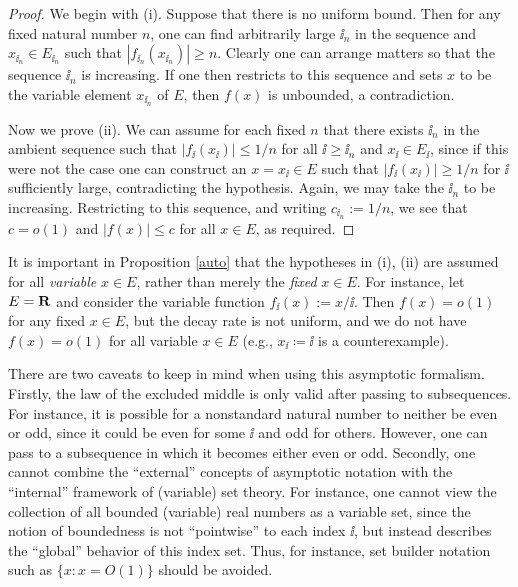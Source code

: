 \begin{proof} We begin with (i).  Suppose that there is no uniform bound.  Then for any fixed natural number $n$, one can find arbitrarily large $\ii_n$ in the sequence and $x_{\ii_n} \in E_{\ii_n}$ such that $|f_{\ii_n}(x_{\ii_n})| \geq n$.  Clearly one can arrange matters so that the sequence $\ii_n$ is increasing.  If one then restricts to this sequence and sets $x$ to be the variable element $x_{\ii_n}$ of $E$, then $f(x)$ is unbounded, a contradiction.

Now we prove (ii).  We can assume for each fixed $n$ that there exists $\ii_n$ in the ambient sequence such that $|f_{\ii}(x_{\ii})| \leq 1/n$ for all $\ii \geq \ii_n$ and $x_{\ii} \in E_{\ii}$, since if this were not the case one can construct an $x = x_{\ii} \in E$ such that $|f_{\ii}(x_{\ii})| \geq 1/n$ for $\ii$ sufficiently large, contradicting the hypothesis.  Again, we may take the $\ii_n$ to be increasing.  Restricting to this sequence, and writing $c_{\ii_n} := 1/n$, we see that $c=o(1)$ and $|f(x)| \leq c$ for all $x \in E$, as required.
\end{proof}

\begin{remark} It is important in Proposition \ref{auto} that the hypotheses in (i), (ii) are assumed for all \emph{variable} $x \in E$, rather than merely the \emph{fixed} $x \in E$.  For instance, let $E = \mathbf{R}$ and consider the variable function $f_{\ii}(x) := x/\ii$.  Then $f(x) = o(1)$ for any fixed $x \in E$, but the decay rate is not uniform, and we do not have $f(x) = o(1)$ for all variable $x \in E$ (e.g., $x_\ii \coloneqq \ii$ is a counterexample).
\end{remark}


\begin{remark} There are two caveats to keep in mind when using this asymptotic formalism.  Firstly, the law of the excluded middle is only valid after passing to subsequences.  For instance, it is possible for a nonstandard natural number to neither be even or odd, since it could be even for some $\ii$ and odd for others.  However, one can pass to a subsequence in which it becomes either even or odd.  Secondly, one cannot combine the ``external'' concepts of asymptotic notation with the ``internal'' framework of (variable) set theory.  For instance, one cannot view the collection of all bounded (variable) real numbers as a variable set, since the notion of boundedness is not ``pointwise'' to each index $\ii$, but instead describes the ``global'' behavior of this index set.  Thus, for instance, set builder notation such as $\{ x: x = O(1) \}$ should be avoided.
\end{remark}
